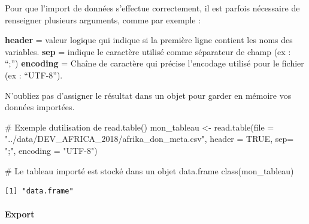 \documentclass[
  letterpaper,
  DIV=11,
  numbers=noendperiod]{scrartcl}
\let\oldparagraph\paragraph
\renewcommand{\paragraph}[1]{\oldparagraph{#1}\mbox{}}
\newenvironment{Shaded}{\begin{snugshade}}{\end{snugshade}}
\newcommand{\AttributeTok}[1]{\textcolor[rgb]{0.40,0.45,0.13}{#1}}
\newcommand{\CommentTok}[1]{\textcolor[rgb]{0.37,0.37,0.37}{#1}}
\newcommand{\ConstantTok}[1]{\textcolor[rgb]{0.56,0.35,0.01}{#1}}
\newcommand{\FunctionTok}[1]{\textcolor[rgb]{0.28,0.35,0.67}{#1}}
\newcommand{\NormalTok}[1]{\textcolor[rgb]{0.00,0.23,0.31}{#1}}
\newcommand{\OtherTok}[1]{\textcolor[rgb]{0.00,0.23,0.31}{#1}}
\newcommand{\StringTok}[1]{\textcolor[rgb]{0.13,0.47,0.30}{#1}}
\begin{document}
Pour que l'import de données s'effectue correctement, il est parfois
nécessaire de renseigner plusieurs arguments, comme par exemple :

\textbf{header} = valeur logique qui indique si la première ligne
contient les noms des variables. \textbf{sep} = indique le caractère
utilisé comme séparateur de champ (ex : ``;'') \textbf{encoding} =
Chaîne de caractère qui précise l'encodage utilisé pour le fichier (ex :
``UTF-8'').

\begin{tcolorbox}[enhanced jigsaw, opacityback=0, bottomrule=.15mm, titlerule=0mm, left=2mm, bottomtitle=1mm, title=\textcolor{quarto-callout-important-color}{\faExclamation}\hspace{0.5em}{Important}, opacitybacktitle=0.6, breakable, colbacktitle=quarto-callout-important-color!10!white, leftrule=.75mm, colframe=quarto-callout-important-color-frame, rightrule=.15mm, toprule=.15mm, coltitle=black, arc=.35mm, colback=white, toptitle=1mm]

N'oubliez pas d'assigner le résultat dans un objet pour garder en
mémoire vos données importées.

\end{tcolorbox}

\begin{Shaded}
\begin{Highlighting}[]
\CommentTok{\# Exemple d\textquotesingle{}utilisation de read.table()}
\NormalTok{mon\_tableau  }\OtherTok{\textless{}{-}} \FunctionTok{read.table}\NormalTok{(}\AttributeTok{file =} \StringTok{"../data/DEV\_AFRICA\_2018/afrika\_don\_meta.csv"}\NormalTok{, }
                           \AttributeTok{header =} \ConstantTok{TRUE}\NormalTok{,}
                           \AttributeTok{sep=} \StringTok{";"}\NormalTok{,}
                           \AttributeTok{encoding =} \StringTok{"UTF{-}8"}\NormalTok{)}


\CommentTok{\# Le tableau importé est stocké dans un objet data.frame}
\FunctionTok{class}\NormalTok{(mon\_tableau)}
\end{Highlighting}
\end{Shaded}

\begin{verbatim}
[1] "data.frame"
\end{verbatim}

\hypertarget{export}{%
\paragraph{Export}\label{export}}
\end{document}
